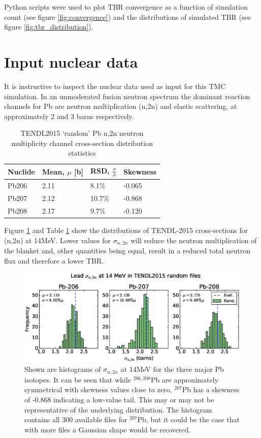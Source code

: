 Python scripts were used to plot TBR convergence as a function of simulation count (see figure \ref{fig:convergence}) and the distributions of simulated TBR (see figure \ref{fig:tbr_distribution}).

\section{Input nuclear data}
\label{sec:data}
It is instructive to inspect the nuclear data used as input for this TMC simulation. In an unmoderated fusion neutron spectrum the dominant reaction channels for Pb are neutron multiplication (n,2n) and elastic scattering, at approximately 2 and 3 barns respectively.

\begin{table}[ht]
  \footnotesize
  \centering 
  \begin{tabular}{llll}
    \toprule
    Nuclide & Mean, $\mu$ [b] & RSD, $\frac{\sigma}{\mu}$ & Skewness \\
    \midrule
    Pb206 & 2.11 & 8.1\% & -0.065 \\
    Pb207 & 2.12 & 10.7\% & -0.868 \\
    Pb208 & 2.17 & 9.7\% & -0.120 \\
    \bottomrule
  \end{tabular}
  \caption{TENDL2015 `random' Pb n,2n neutron multiplicity channel cross-section distribution statistics}
  \label{table:n2n} %
\end{table}

Figure \ref{fig:tendl_n2n} and Table \ref{table:n2n} show the distributions of TENDL-2015 cross-sections for (n,2n) at 14MeV. Lower values for $\sigma_{n,2n}$ will reduce the neutron multiplication of the blanket and, other quantities being equal, result in a reduced total neutron flux and therefore a lower TBR.

\begin{figure}[ht]
	\includegraphics[width=\textwidth]{pb_tendl_n2n_hist}
	\caption{Shown are histograms of $\sigma_{n,2n}$ at 14MeV for the three major Pb isotopes. It can be seen that while $^{206,208}$Pb are approximately symmetrical with skewness values close to zero, $^{207}$Pb has a skewness of -0.868 indicating a low-value tail. This may or may not be representative of the underlying distribution. The histogram contains all 300 available files for $^{207}$Pb, but it could be the case that with more files a Gaussian shape would be recovered.}
	\label{fig:tendl_n2n}
\end{figure}

